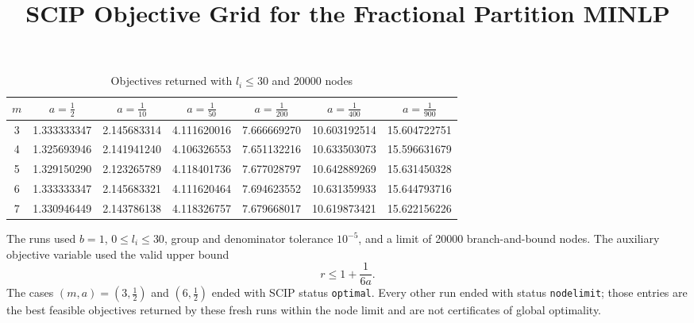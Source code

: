 \documentclass[11pt]{article}
\title{SCIP Objective Grid for the Fractional Partition MINLP}
\author{}
\date{}
\begin{document}
\maketitle

\begin{table}[htbp]
  \centering
  \caption{Objectives returned with \(l_i\leq 30\) and 20000 nodes}
  \label{tab:objective-grid-m3-m7-l30-n20000}
  \begin{tabular}{
    c
    S[table-format=2.9]
    S[table-format=2.9]
    S[table-format=2.9]
    S[table-format=2.9]
    S[table-format=2.9]
    S[table-format=2.9]
  }
    \toprule
    {$m$}
      & {$a=\frac{1}{2}$}
      & {$a=\frac{1}{10}$}
      & {$a=\frac{1}{50}$}
      & {$a=\frac{1}{200}$}
      & {$a=\frac{1}{400}$}
      & {$a=\frac{1}{900}$} \\
     & 1.333333347 & 2.145683314 & 4.111620016 & 7.666669270 & 10.603192514 & 15.604722751 \\
    4 & 1.325693946 & 2.141941240 & 4.106326553 & 7.651132216 & 10.633503073 & 15.596631679 \\
    5 & 1.329150290 & 2.123265789 & 4.118401736 & 7.677028797 & 10.642889269 & 15.631450328 \\
    6 & 1.333333347 & 2.145683321 & 4.111620464 & 7.694623552 & 10.631359933 & 15.644793716 \\
    7 & 1.330946449 & 2.143786138 & 4.118326757 & 7.679668017 & 10.619873421 & 15.622156226 \\
    \bottomrule
  \end{tabular}
\end{table}

\noindent
The runs used \(b=1\), \(0\leq l_i\leq 30\), group and denominator
tolerance \(10^{-5}\), and a limit of 20000 branch-and-bound nodes. The
auxiliary objective variable used the valid upper bound
\[
  r\leq 1+\frac{1}{6a}.
\]
The cases \((m,a)=(3,\frac12)\) and \((6,\frac12)\) ended with SCIP
status \texttt{optimal}. Every other run ended with status
\texttt{nodelimit}; those entries are the best feasible objectives
returned by these fresh runs within the node limit and are not
certificates of global optimality.
\end{document}
